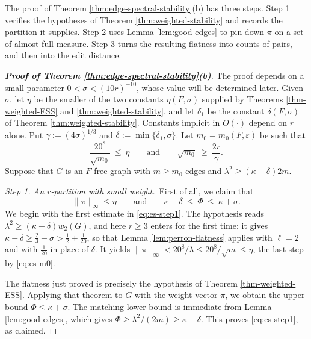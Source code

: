 \documentclass[11pt, a4paper]{article}
\theoremstyle{definition}
\theoremstyle{plain}
\renewcommand{\le}{\leqslant}
\renewcommand{\ge}{\geqslant}
\begin{document}
The proof of Theorem \ref{thm:edge-spectral-stability}(b) has three steps. 
Step 1 verifies the hypotheses of Theorem
\ref{thm:weighted-stability} and records the partition it supplies. 
Step 2 uses Lemma \ref{lem:good-edges} to pin down $\pi$ on a set of almost full measure. Step 3 turns the resulting flatness into counts of pairs, and then into the edit distance.

\begin{proof}[{\bf Proof of Theorem
\ref{thm:edge-spectral-stability}(b)}] 
The proof depends on a small parameter
$0< \sigma < (10r)^{-10} $, whose value will be determined later. Given  $\sigma$, let $\eta$ be the
smaller of the two constants $\eta (F,\sigma )$ supplied by
Theorems \ref{thm-weighted-ESS} and
\ref{thm:weighted-stability}, and let $\delta_1$ be the
constant $\delta (F,\sigma )$ of Theorem
\ref{thm:weighted-stability}. 
 Constants implicit in $O(\cdot )$ depend on $r$ alone. 
Put $\gamma :=(4\sigma )^{1/3}$ and $\delta :=\min \{\delta_1,\sigma \}$. Let
$m_0=m_0(F,\varepsilon )$ be such that
\begin{equation}\label{eq:es-m0}
  \frac{20^{8}}{\sqrt{m_0}}\ \le\ \eta
  \qquad\text{and}\qquad
  \sqrt{m_0}\ \ge\ \frac{2r}{\gamma}.
\end{equation}
Suppose that $G$ is an $F$-free graph with $m\ge m_0$ edges and
$\lambda^{2}\ge (\kappa -\delta )2m$.

\medskip\noindent
\textit{Step 1. An $r$-partition with small weight.}\
First of all, we claim that 
\begin{equation}\label{eq:es-step1}
  \lVert \pi \rVert_\infty \le \eta
  \qquad\text{and}\qquad
  \kappa -\delta \ \le\ \Phi \ \le\ \kappa +\sigma .
\end{equation} 
We begin with the first estimate in \eqref{eq:es-step1}. The
hypothesis reads $\lambda^{2}\ge (\kappa -\delta )w_2(G)$,
and here $r\ge 3$ enters for the first time: it gives
$\kappa -\delta \ge \frac23-\sigma >\frac12+\frac1{20}$, so
that Lemma \ref{lem:perron-flatness} applies with $\ell =2$
and with $\frac{1}{20}$ in place of $\delta$. It yields
$\lVert \pi \rVert_\infty <20^{8}/\lambda \le
20^{8}/\sqrt{m}\le \eta$, the last step by \eqref{eq:es-m0}.

The flatness just proved is precisely the hypothesis of
Theorem \ref{thm-weighted-ESS}. Applying that theorem to $G$
with the weight vector $\pi$, we obtain the upper bound
$\Phi \le \kappa +\sigma$. The matching lower bound is
immediate from Lemma \ref{lem:good-edges}, which gives
$\Phi \ge \lambda^{2}/(2m)\ge \kappa -\delta$. This proves  \eqref{eq:es-step1}, as claimed.



\end{proof}
\end{document}
